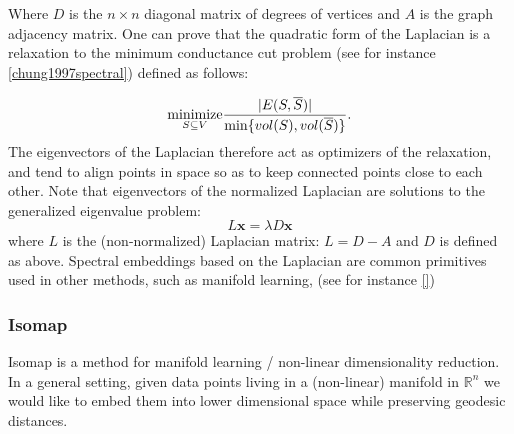 Where $D$ is the $n \times n$ diagonal matrix of degrees of vertices and $A$ is the graph adjacency matrix. One can prove that the quadratic form of the Laplacian is a relaxation to the minimum conductance cut problem (see for instance \ref{chung1997spectral}) defined as follows:

\[
    \underset{S  \subseteq V }{\text{minimize}} {|E(S,\overline{S})|\over \min\{vol(S), vol(\overline{S})\}}.
\]
The eigenvectors of the Laplacian therefore act as optimizers of the relaxation, and tend to align points in space so as to keep connected points close to each other. Note that eigenvectors of the normalized Laplacian are solutions to the generalized eigenvalue problem:
\[
    L\mathbf{x} = \lambda D\mathbf{x}
\]
where $L$ is the (non-normalized) Laplacian matrix: $L = D-A$ and $D$ is defined as above. Spectral embeddings based on the Laplacian are common primitives used in other methods, such as manifold learning, (see for instance \ref{})

\subsubsection*{Isomap}
Isomap is a method for manifold learning / non-linear dimensionality reduction. In a general setting, given data points living in a (non-linear) manifold in $\mathbb{R}^n$ we would like to embed them into lower dimensional space while preserving geodesic distances.
